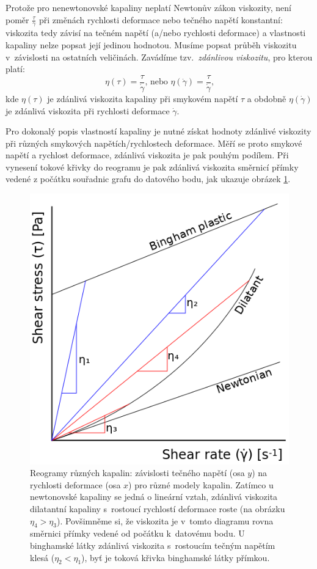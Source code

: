 \documentclass[12pt]{article}
\begin{document}
\par
Protože pro nenewtonovské kapaliny neplatí Newtonův zákon viskozity, není poměr $\frac{\tau}{\dot\gamma}$ při změnách rychlosti deformace nebo tečného napětí konstantní: viskozita tedy závisí na tečném napětí (a/nebo rychlosti deformace) a vlastnosti kapaliny nelze popsat její jedinou hodnotou. Musíme popsat průběh viskozitu v~závislosti na ostatních veličinách. Zavádíme tzv.~\emph{zdánlivou viskozitu}, pro kterou platí:~\cite{wiki:Apparent_viscosity}
\begin{equation}
    \eta(\tau) = \frac{\tau}{\dot\gamma}\text{, nebo }\eta(\dot\gamma) = \frac{\tau}{\dot\gamma}\text{,}
    \label{eq:zdanliva_viskozita}
\end{equation}
kde $\eta(\tau)$ je zdánlivá viskozita kapaliny při smykovém napětí $\tau$ a obdobně $\eta(\dot\gamma)$ je zdánlivá viskozita při rychlosti deformace $\dot\gamma$.
\par
Pro dokonalý popis vlastností kapaliny je nutné získat hodnoty zdánlivé viskozity při různých smykových napětích/rychlostech deformace. Měří se proto smykové napětí a rychlost deformace, zdánlivá viskozita je pak pouhým podílem. Při vynesení tokové křivky do reogramu je pak zdánlivá viskozita směrnicí přímky vedené z počátku souřadnic grafu do datového bodu, jak ukazuje obrázek \ref{fig:apparent_viscosity}.

\begin{figure}
    \centering
    \includegraphics[width = 0.5\linewidth]{figures/Apparent_viscosity.png}
    \caption{Reogramy různých kapalin: závislosti tečného napětí (osa $y$) na rychlosti deformace (osa $x$) pro různé modely kapalin. Zatímco u newtonovské kapaliny se jedná o lineární vztah, zdánlivá viskozita dilatantní kapaliny s~rostoucí rychlostí deformace roste (na obrázku $\eta_4 > \eta_3$). Povšimněme si, že viskozita je v~tomto diagramu rovna směrnici přímky vedené od počátku k~datovému bodu. U binghamské látky zdánlivá viskozita s~rostoucím tečným napětím klesá ($\eta_2 < \eta_1$), byť je toková křivka binghamské látky přímkou.~\cite{Figure:apparent_viscosity}}
    \label{fig:apparent_viscosity}
\end{figure}
\end{document}
